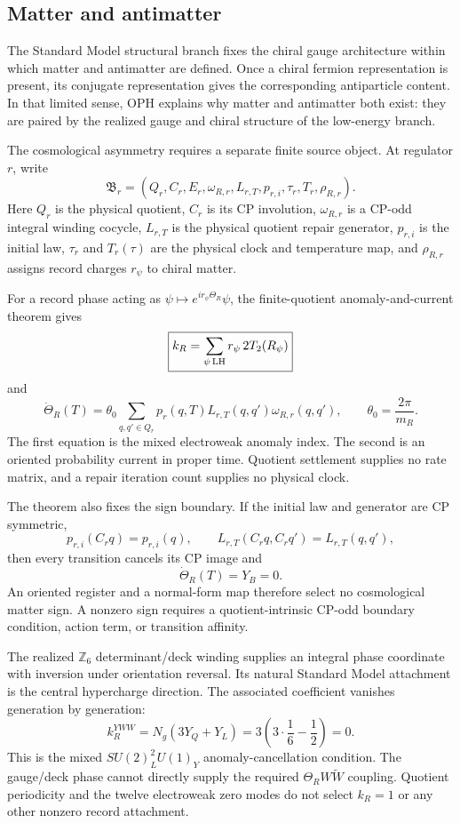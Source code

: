 \documentclass[11pt]{article}
\begin{document}
\subsection{Matter and antimatter}
\label{subsec:baryogenesis-source}

The Standard Model structural branch fixes the chiral gauge architecture within which
matter and antimatter are defined. Once a chiral fermion representation is present, its conjugate
representation gives the corresponding antiparticle content. In that limited sense, OPH explains
why matter and antimatter both exist: they are paired by the realized gauge and chiral structure
of the low-energy branch.

The cosmological asymmetry requires a separate finite source object. At regulator \(r\), write
\[
\mathfrak B_r=(Q_r,C_r,E_r,\omega_{R,r},L_{r,T},p_{r,i},
\tau_r,T_r,\rho_{R,r}).
\]
Here \(Q_r\) is the physical quotient, \(C_r\) is its CP involution,
\(\omega_{R,r}\) is a CP-odd integral winding cocycle, \(L_{r,T}\) is the
physical quotient repair generator, \(p_{r,i}\) is the initial law,
\(\tau_r\) and \(T_r(\tau)\) are the physical clock and temperature map, and
\(\rho_{R,r}\) assigns record charges \(r_\psi\) to chiral matter.

For a record phase acting as
\(\psi\mapsto e^{ir_\psi\Theta_R}\psi\), the finite-quotient
anomaly-and-current theorem gives
\[
\boxed{
k_R=\sum_{\psi\,{\rm LH}}r_\psi\,2T_2(R_\psi)
}
\]
and
\[
\boxed{
\dot\Theta_R(T)=\theta_0
\sum_{q,q'\in Q_r}p_r(q,T)L_{r,T}(q,q')
\omega_{R,r}(q,q')
},
\qquad \theta_0=\frac{2\pi}{m_R}.
\]
The first equation is the mixed electroweak anomaly index. The second is an
oriented probability current in proper time. Quotient settlement supplies no
rate matrix, and a repair iteration count supplies no physical clock.

The theorem also fixes the sign boundary. If the initial law and generator are
CP symmetric,
\[
p_{r,i}(C_rq)=p_{r,i}(q),
\qquad
L_{r,T}(C_rq,C_rq')=L_{r,T}(q,q'),
\]
then every transition cancels its CP image and
\[
\boxed{\dot\Theta_R(T)=Y_B=0.}
\]
An oriented register and a normal-form map therefore select no cosmological
matter sign. A nonzero sign requires a quotient-intrinsic CP-odd boundary
condition, action term, or transition affinity.

The realized \(\mathbb Z_6\) determinant/deck winding supplies an integral
phase coordinate with inversion under orientation reversal. Its natural
Standard Model attachment is the central hypercharge direction. The associated
coefficient vanishes generation by generation:
\[
\boxed{
k_R^{YWW}=N_g(3Y_Q+Y_L)
=3\left(3\cdot\frac16-\frac12\right)=0.
}
\]
This is the mixed \(SU(2)_L^2U(1)_Y\) anomaly-cancellation condition. The
gauge/deck phase cannot directly supply the required
\(\Theta_R W\widetilde W\) coupling. Quotient periodicity and the twelve
electroweak zero modes do not select \(k_R=1\) or any other nonzero record
attachment.
\end{document}
